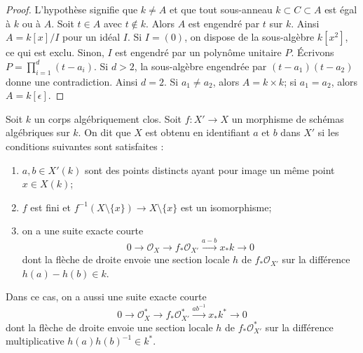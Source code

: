 \begin{proof}
L'hypothèse signifie que $k \not = A$ et que tout sous-anneau $k \subset C \subset A$ est égal à $k$ ou à $A$. Soit $t \in A$ avec $t \not \in k$. Alors $A$ est engendré par $t$ sur $k$. Ainsi $A = k[x]/I$ pour un idéal $I$. Si $I = (0)$, on dispose de la sous-algèbre $k[x^2]$, ce qui est exclu. Sinon, $I$ est engendré par un polynôme unitaire $P$. Écrivons $P = \prod_{i = 1}^d (t - a_i)$. Si $d > 2$, la sous-algèbre engendrée par $(t - a_1)(t - a_2)$ donne une contradiction. Ainsi $d = 2$. Si $a_1 \not = a_2$, alors $A = k \times k$; si $a_1 = a_2$, alors $A = k[\epsilon]$.
\end{proof}

\begin{example} \label{example-glue-points} Soit $k$ un corps algébriquement clos. Soit $f : X' \to X$ un morphisme de schémas algébriques sur $k$. On dit que $X$ est obtenu en identifiant $a$ et $b$ dans $X'$ si les conditions suivantes sont satisfaites : \begin{enumerate} \item $a, b \in X'(k)$ sont des points distincts ayant pour image un même point $x \in X(k)$; \item $f$ est fini et $f^{-1}(X \setminus \{x\}) \to X \setminus \{x\}$ est un isomorphisme; \item on a une suite exacte courte $$
0 \to \mathcal{O}_X \to f_*\mathcal{O}_{X'} \xrightarrow{a - b} x_*k \to 0
$$ dont la flèche de droite envoie une section locale $h$ de $f_*\mathcal{O}_{X'}$ sur la différence $h(a) - h(b) \in k$. \end{enumerate} Dans ce cas, on a aussi une suite exacte courte $$
0 \to \mathcal{O}_X^* \to f_*\mathcal{O}_{X'}^*
\xrightarrow{ab^{-1}} x_*k^* \to 0
$$ dont la flèche de droite envoie une section locale $h$ de $f_*\mathcal{O}_{X'}^*$ sur la différence multiplicative $h(a)h(b)^{-1} \in k^*$.
\end{example}

